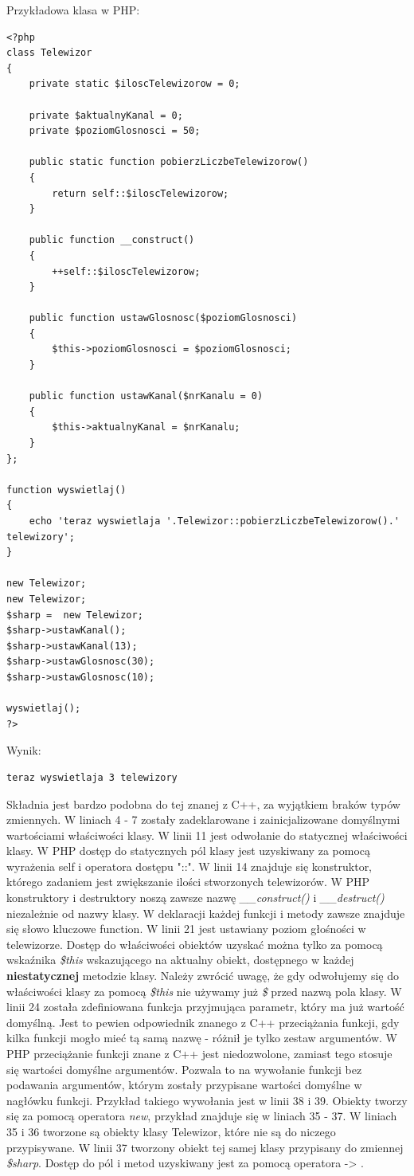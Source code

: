 \documentclass[a4paper,10pt]{article}
\begin{document}
\pagebreak
Przykładowa klasa w PHP: \\
\begin{verbatim}
<?php
class Telewizor
{
	private static $iloscTelewizorow = 0;
	
	private $aktualnyKanal = 0;
	private $poziomGlosnosci = 50;
	
	public static function pobierzLiczbeTelewizorow()
	{
		return self::$iloscTelewizorow;
	}
	
	public function __construct()
	{
		++self::$iloscTelewizorow;
	}
	
	public function ustawGlosnosc($poziomGlosnosci)
	{
		$this->poziomGlosnosci = $poziomGlosnosci;
	}
	
	public function ustawKanal($nrKanalu = 0)
	{
		$this->aktualnyKanal = $nrKanalu;
	}
};

function wyswietlaj()
{
	echo 'teraz wyswietlaja '.Telewizor::pobierzLiczbeTelewizorow().' telewizory';
}

new Telewizor;
new Telewizor;
$sharp =  new Telewizor;
$sharp->ustawKanal();
$sharp->ustawKanal(13);
$sharp->ustawGlosnosc(30);
$sharp->ustawGlosnosc(10);

wyswietlaj();
?>
\end{verbatim}
Wynik:
\begin{verbatim}
teraz wyswietlaja 3 telewizory
\end{verbatim}
Składnia jest bardzo podobna do tej znanej z C++, za wyjątkiem braków typów zmiennych. W liniach 4 - 7 zostały zadeklarowane i zainicjalizowane domyślnymi wartościami właściwości klasy. W linii 11 jest odwołanie do statycznej właściwości klasy. W PHP dostęp do statycznych pól klasy jest uzyskiwany za pomocą wyrażenia self i operatora dostępu "::". W linii 14 znajduje się konstruktor, którego zadaniem jest zwiększanie ilości stworzonych telewizorów. W PHP konstruktory i destruktory noszą zawsze nazwę \textit{\_\_construct()} i \textit{\_\_destruct()} niezależnie od nazwy klasy. W deklaracji każdej funkcji i metody zawsze znajduje się słowo kluczowe function. W linii 21 jest ustawiany poziom głośności w telewizorze. Dostęp do właściwości obiektów uzyskać można tylko za pomocą wskaźnika \textit{\$this} wskazującego na aktualny obiekt, dostępnego w każdej \textbf{niestatycznej} metodzie klasy. Należy zwrócić uwagę, że gdy odwołujemy się do właściwości klasy za pomocą \textit{\$this} nie używamy już \textit{\$} przed nazwą pola klasy. W linii 24 została zdefiniowana funkcja przyjmująca parametr, który ma już wartość domyślną. Jest to pewien odpowiednik znanego z C++ przeciążania funkcji, gdy kilka funkcji mogło mieć tą samą nazwę - różnił je tylko zestaw argumentów. W PHP przeciążanie funkcji znane z C++ jest niedozwolone, zamiast tego stosuje się wartości domyślne argumentów. Pozwala to na wywołanie funkcji bez podawania argumentów, którym zostały przypisane wartości domyślne w nagłówku funkcji. Przykład takiego wywołania jest w linii 38 i 39.
Obiekty tworzy się za pomocą operatora \textit{new}, przykład znajduje się w liniach 35 - 37. W liniach 35 i 36 tworzone są obiekty klasy Telewizor, które nie są do niczego przypisywane. W linii 37 tworzony obiekt tej samej klasy przypisany do zmiennej \textit{\$sharp}. Dostęp do pól i metod uzyskiwany jest za pomocą operatora -> .
\end{document}
